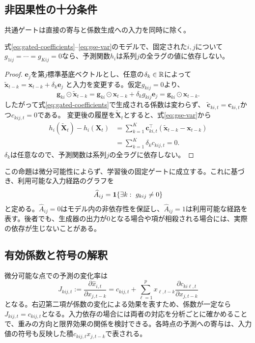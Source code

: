 \subsection{非因果性の十分条件}
共通ゲートは直接の寄与と係数生成への入力を同時に除く。

\begin{samepage}
\begin{proposition}[入力系列への非依存性]
\label{prop:noncausality}
式\eqref{eq:gated-coefficients}--\eqref{eq:gse-var}のモデルで、固定された\(i,j\)について
\(g_{1ij}=\cdots=g_{Kij}=0\)なら、予測関数\(h_i\)は系列\(j\)の全ラグの値に依存しない。
\end{proposition}
\begin{proof}
\(\bm e_j\)を第\(j\)標準基底ベクトルとし、任意の\(\delta_k\in\mathbb{R}\)によって
\(\widetilde{\bm x}_{t-k}=\bm x_{t-k}+\delta_k\bm e_j\)
と入力を変更する。仮定\(g_{kij}=0\)より、
\begin{equation*}
 \bm g_{ki}\odot\widetilde{\bm x}_{t-k}
 =\bm g_{ki}\odot\bm x_{t-k}
   +\delta_k g_{kij}\bm e_j
 =\bm g_{ki}\odot\bm x_{t-k}.
\end{equation*}
したがって式\eqref{eq:gated-coefficients}で生成される係数は変わらず、
\(\widetilde{\bm c}_{ki,t}=\bm c_{ki,t}\)かつ\(c_{kij,t}=0\)である。
変更後の履歴を\(\widetilde{\bm X}_t\)とすると、式\eqref{eq:gse-var}から
\begin{align*}
 h_i(\widetilde{\bm X}_t)-h_i(\bm X_t)
 &=\sum_{k=1}^{K}\bm c_{ki,t}^{\top}
       (\widetilde{\bm x}_{t-k}-\bm x_{t-k})\\
 &=\sum_{k=1}^{K}\delta_k c_{kij,t}=0.
\end{align*}
\(\delta_k\)は任意なので、予測関数は系列\(j\)の全ラグに依存しない。
\end{proof}
\end{samepage}

この命題は微分可能性によらず、学習後の固定ゲートに成立する。これに基づき、利用可能な入力経路のグラフを
\begin{equation}
 \widehat A_{ij}=\ind\!\left\{\exists k:\ g_{kij}\ne0\right\}
 \label{eq:graph-support}
\end{equation}
と定める。\(\widehat A_{ij}=0\)はモデル内の非依存性を保証し、\(\widehat A_{ij}=1\)は利用可能な経路を表す。後者でも、生成器の出力が\(0\)となる場合や項が相殺される場合には、実際の依存が生じないことがある。

\subsection{有効係数と符号の解釈}
微分可能な点での予測の変化率は
\begin{equation}
 J_{kij,t}
 :=\frac{\partial\widehat x_{i,t}}{\partial x_{j,t-k}}
 =c_{kij,t}
 +\sum_{\ell=1}^{p}x_{\ell,t-k}
       \frac{\partial c_{ki\ell,t}}{\partial x_{j,t-k}}
 \label{eq:jacobian}
\end{equation}
となる。右辺第二項が係数の変化による効果を表すため、係数が一定なら\(J_{kij,t}=c_{kij,t}\)となる。入力依存の場合には両者の対応を分析ごとに確かめることで、重みの方向と限界効果の関係を検討できる。各時点の予測への寄与は、入力値の符号も反映した積\(c_{kij,t}x_{j,t-k}\)で表される。


